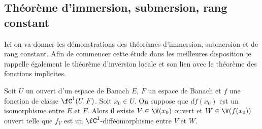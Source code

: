 \documentclass[10pt,a4paper]{article}
\begin{document}
  \subsection{Théorème d'immersion, submersion, rang constant}
  Ici on va donner les démonstrations des théorèmes  d'immersion, submersion et de rang constant. Afin de commencer cette étude dans les meilleures disposition je rappelle également le théorème d'inversion locale et son lien avec le théorème des fonctions implicites.
  \begin{thm}
    Soit $U$ un ouvert d'un espace de Banach $E$, $F$ un espace de Banach et $f$ une fonction de classe $\fC^1(U,F)$. Soit $x_0 \in U$. On suppose que $df(x_0)$ est un isomorphisme entre $E$ et $F$. Alors il existe $V \in \V(x_0)$ ouvert et $W \in \V(f(x_0))$ ouvert telle que $f_{V}$ est un $\fC^1$-difféomorphisme entre $V$ et $W$.
  \end{thm}
\end{document}
